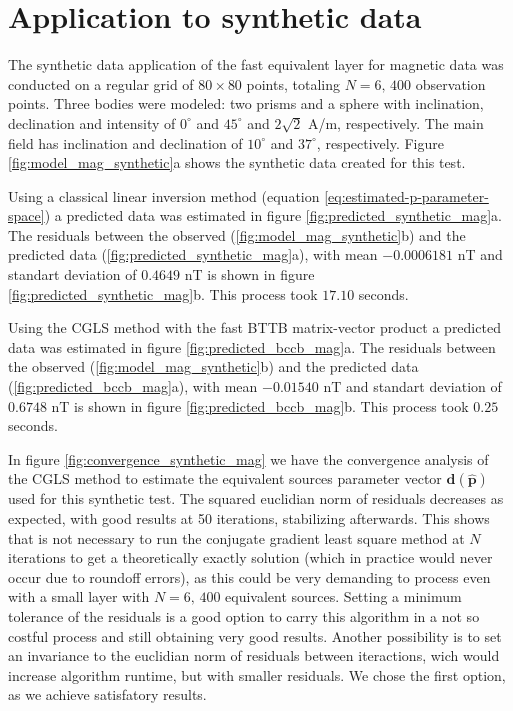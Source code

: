 \section{Application to synthetic data}

The synthetic data application of the fast equivalent layer for magnetic data was conducted on a regular grid of  $80 \times 80$ points, totaling $N = 6,\, 400$ observation points. Three bodies were modeled: two prisms and a sphere with inclination, declination and intensity of $0^{\circ}$ and $45^{\circ}$ and $2\sqrt{2}$ A/m, respectively. The main field has inclination and declination of $10^{\circ}$ and $37^{\circ}$, respectively. Figure \ref{fig:model_mag_synthetic}a shows the synthetic data created for this test.

Using a classical linear inversion method (equation \ref{eq:estimated-p-parameter-space}) a predicted data was estimated in figure \ref{fig:predicted_synthetic_mag}a. The residuals between the observed (\ref{fig:model_mag_synthetic}b) and the predicted data (\ref{fig:predicted_synthetic_mag}a), with mean $-0.0006181$ nT and standart deviation of $0.4649$ nT is shown in figure \ref{fig:predicted_synthetic_mag}b. This process took $17.10$ seconds.

Using the CGLS method with the fast BTTB matrix-vector product a predicted data was estimated in figure \ref{fig:predicted_bccb_mag}a. The residuals between the observed (\ref{fig:model_mag_synthetic}b) and the predicted data (\ref{fig:predicted_bccb_mag}a), with mean $-0.01540$ nT and standart deviation of $0.6748$ nT is shown in figure \ref{fig:predicted_bccb_mag}b. This process took $0.25$ seconds.

In figure \ref{fig:convergence_synthetic_mag} we have the convergence analysis of the CGLS method to estimate the equivalent sources parameter vector $\mathbf{d}(\hat{\mathbf{p}})$ used for this synthetic test. The squared euclidian norm of residuals decreases as expected, with good results at 50 iterations, stabilizing afterwards. This shows that is not necessary to run the conjugate gradient least square method at $N$ iterations to get a theoretically exactly solution (which in practice would never occur due to roundoff errors), as this could be very demanding to process even with a small layer with $N = 6,\, 400$ equivalent sources. Setting a minimum tolerance of the residuals is a good option to carry this algorithm in a not so costful process and still obtaining very good results. Another possibility is to set an invariance to the euclidian norm of residuals between iteractions, wich would increase algorithm runtime, but with smaller residuals. We chose the first option, as we achieve satisfatory results.

